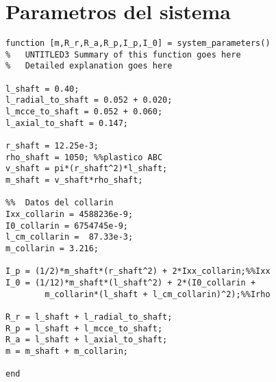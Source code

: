 \chapter{Parametros del sistema}

\begin{lstlisting}[frame=single]
function [m,R_r,R_a,R_p,I_p,I_0] = system_parameters()
%	UNTITLED3 Summary of this function goes here
%   Detailed explanation goes here

l_shaft = 0.40;
l_radial_to_shaft = 0.052 + 0.020;
l_mcce_to_shaft = 0.052 + 0.060;
l_axial_to_shaft = 0.147;

r_shaft = 12.25e-3;
rho_shaft = 1050; %%plastico ABC
v_shaft = pi*(r_shaft^2)*l_shaft;
m_shaft = v_shaft*rho_shaft;

%%	Datos del collarin
Ixx_collarin = 4588236e-9;
I0_collarin = 6754745e-9;
l_cm_collarin =  87.33e-3;
m_collarin = 3.216;

I_p = (1/2)*m_shaft*(r_shaft^2) + 2*Ixx_collarin;%%Ixx
I_0 = (1/12)*m_shaft*(l_shaft^2) + 2*(I0_collarin + 
		m_collarin*(l_shaft + l_cm_collarin)^2);%%Irho

R_r = l_shaft + l_radial_to_shaft;
R_p = l_shaft + l_mcce_to_shaft;
R_a = l_shaft + l_axial_to_shaft;
m = m_shaft + m_collarin;

end
\end{lstlisting}
 